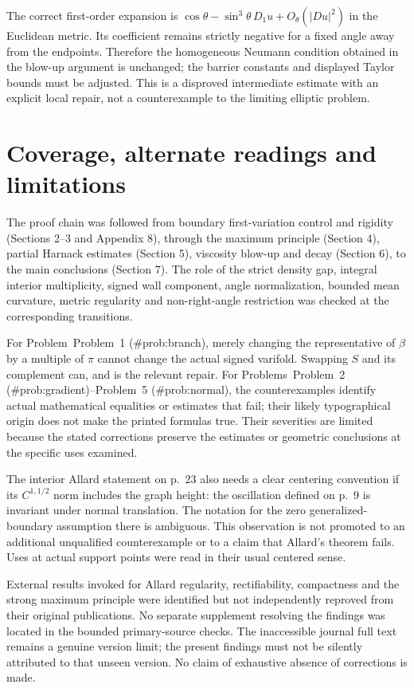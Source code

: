 \documentclass[10pt]{article}
\begin{document}
The correct first-order expansion is \(\cos\theta-\sin^3\theta\,D_1u+O_\theta(|Du|^2)\) in the Euclidean metric. Its coefficient remains strictly negative for a fixed angle away from the endpoints. Therefore the homogeneous Neumann condition obtained in the blow-up argument is unchanged; the barrier constants and displayed Taylor bounds must be adjusted. This is a disproved intermediate estimate with an explicit local repair, not a counterexample to the limiting elliptic problem.\par
\section*{Coverage, alternate readings and limitations}
The proof chain was followed from boundary first-variation control and rigidity (Sections 2–3 and Appendix 8), through the maximum principle (Section 4), partial Harnack estimates (Section 5), viscosity blow-up and decay (Section 6), to the main conclusions (Section 7). The role of the strict density gap, integral interior multiplicity, signed wall component, angle normalization, bounded mean curvature, metric regularity and non-right-angle restriction was checked at the corresponding transitions.\par
For Problem Problem 1 (\#prob:branch), merely changing the representative of \(\beta\) by a multiple of \(\pi\) cannot change the actual signed varifold. Swapping \(S\) and its complement can, and is the relevant repair. For Problems Problem 2 (\#prob:gradient)–Problem 5 (\#prob:normal), the counterexamples identify actual mathematical equalities or estimates that fail; their likely typographical origin does not make the printed formulas true. Their severities are limited because the stated corrections preserve the estimates or geometric conclusions at the specific uses examined.\par
The interior Allard statement on p. 23 also needs a clear centering convention if its \(C^{1,1/2}\) norm includes the graph height: the oscillation defined on p. 9 is invariant under normal translation. The notation for the zero generalized-boundary assumption there is ambiguous. This observation is not promoted to an additional unqualified counterexample or to a claim that Allard’s theorem fails. Uses at actual support points were read in their usual centered sense.\par
External results invoked for Allard regularity, rectifiability, compactness and the strong maximum principle were identified but not independently reproved from their original publications. No separate supplement resolving the findings was located in the bounded primary-source checks. The inaccessible journal full text remains a genuine version limit; the present findings must not be silently attributed to that unseen version. No claim of exhaustive absence of corrections is made.\par
\end{document}
